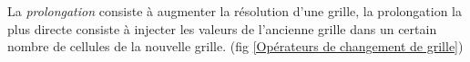 La \emph{prolongation} consiste à augmenter la résolution d'une grille, la prolongation la plus directe consiste à injecter les valeurs de l'ancienne grille dans un certain nombre de cellules de la nouvelle grille. (fig \ref{Opérateurs de changement de grille})

\begin{figure}[htbp]
\begin{center}
\\

\end{center}
\end{figure}
